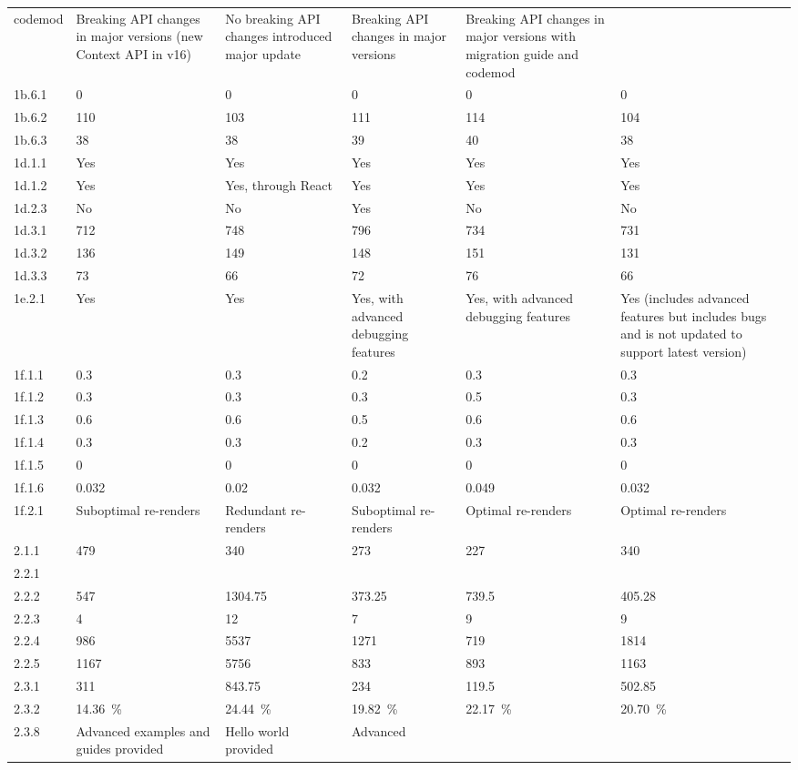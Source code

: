 \begin{longtable}[]{|p{1.5cm}p{2.25cm}p{2.25cm}p{2.25cm}p{2.25cm}p{2cm}|}
codemod & Breaking API changes in major versions (new Context API in
v16) & No breaking API changes introduced major update & Breaking API
changes in major versions & Breaking API changes in major versions with
migration guide and codemod \\
1b.6.1 & 0 & 0 & 0 & 0 & 0 \\
1b.6.2 & 110 & 103 & 111 & 114 & 104 \\
1b.6.3 & 38 & 38 & 39 & 40 & 38 \\
1d.1.1 & Yes & Yes & Yes & Yes & Yes \\
1d.1.2 & Yes & Yes, through React & Yes & Yes & Yes \\
1d.2.3 & No & No & Yes & No & No \\
1d.3.1 & 712 & 748 & 796 & 734 & 731 \\
1d.3.2 & 136 & 149 & 148 & 151 & 131 \\
1d.3.3 & 73 & 66 & 72 & 76 & 66 \\
1e.2.1 & Yes & Yes & Yes, with advanced debugging features & Yes, with
advanced debugging features & Yes (includes advanced features but
includes bugs and is not updated to support latest version) \\
1f.1.1 & 0.3 & 0.3 & 0.2 & 0.3 & 0.3 \\
1f.1.2 & 0.3 & 0.3 & 0.3 & 0.5 & 0.3 \\
1f.1.3 & 0.6 & 0.6 & 0.5 & 0.6 & 0.6 \\
1f.1.4 & 0.3 & 0.3 & 0.2 & 0.3 & 0.3 \\
1f.1.5 & 0 & 0 & 0 & 0 & 0 \\
1f.1.6 & 0.032 & 0.02 & 0.032 & 0.049 & 0.032 \\
1f.2.1 & Suboptimal re-renders & Redundant re-renders & Suboptimal
re-renders & Optimal re-renders & Optimal re-renders \\
2.1.1 & 479 & 340 & 273 & 227 & 340 \\
2.2.1 & & & & & \\
2.2.2 & 547 & 1304.75 & 373.25 & 739.5 & 405.28 \\
2.2.3 & 4 & 12 & 7 & 9 & 9 \\
2.2.4 & 986 & 5537 & 1271 & 719 & 1814 \\
2.2.5 & 1167 & 5756 & 833 & 893 & 1163 \\
2.3.1 & 311 & 843.75 & 234 & 119.5 & 502.85 \\
2.3.2 & 14.36~\% & 24.44~\% & 19.82~\% & 22.17~\% & 20.70~\% \\
2.3.8 & Advanced examples and guides provided &
Hello world provided & Advanced

\end{longtable}
